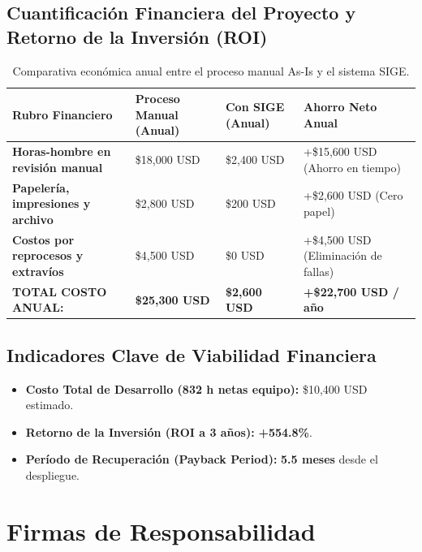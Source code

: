 \documentclass[12pt,a4paper]{article}
\begin{document}
\subsection{Cuantificación Financiera del Proyecto y Retorno de la Inversión (ROI)}
\begin{table}[H]
\centering
\small
\renewcommand{\arraystretch}{1.2}
\begin{tabularx}{\textwidth}{|>{\hsize=1.0\hsize\raggedright\arraybackslash\bfseries\footnotesize}X|>{\hsize=0.4\hsize\centering\arraybackslash\footnotesize}X|>{\hsize=0.4\hsize\centering\arraybackslash\footnotesize}X|>{\hsize=2.2\hsize\raggedright\arraybackslash\footnotesize}X|}
\hline
\rowcolor{tableheader}
\textbf{Rubro Financiero} & \textbf{Proceso Manual (Anual)} & \textbf{Con SIGE (Anual)} & \textbf{Ahorro Neto Anual} \\
\hline
Horas-hombre en revisión manual & \$18,000 USD & \$2,400 USD & +\$15,600 USD (Ahorro en tiempo) \\
\hline
Papelería, impresiones y archivo & \$2,800 USD & \$200 USD & +\$2,600 USD (Cero papel) \\
\hline
Costos por reprocesos y extravíos & \$4,500 USD & \$0 USD & +\$4,500 USD (Eliminación de fallas) \\
\hline
\textbf{TOTAL COSTO ANUAL:} & \textbf{\$25,300 USD} & \textbf{\$2,600 USD} & \textbf{+\$22,700 USD / año} \\
\hline
\end{tabularx}
\caption{Comparativa económica anual entre el proceso manual As-Is y el sistema SIGE.}
\label{tab:comparativa_financiera}
\end{table}

\subsection{Indicadores Clave de Viabilidad Financiera}
\begin{itemize}[leftmargin=1.5em, itemsep=2pt]
    \item \textbf{Costo Total de Desarrollo (832 h netas equipo):} \$10,400 USD estimado.
    \item \textbf{Retorno de la Inversión (ROI a 3 años):} \textbf{+554.8\%}.
    \item \textbf{Período de Recuperación (Payback Period):} \textbf{5.5 meses} desde el despliegue.
\end{itemize}

\section{Firmas de Responsabilidad}
\end{document}
